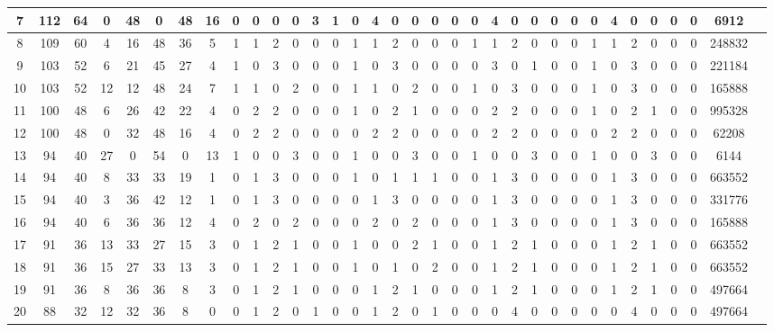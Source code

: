 \begin{frame}
{{\begin{tabular}{|c|c|c|c|c|c|c|c|c|c|c|c|c|c|c|c|c|c|c|c|c|c|c|c|c|c|c|c|c|c|c|c|c|c|}
				\hline
				7 & 112 & 64 & 0 & 48 & 0 & 48 & 16 & 0 & 0 & 0 & 0 & 3 & 1 & 0 & 4 & 0 & 0 & 0 & 0 & 0 & 4 & 0 & 0 & 0 & 0 & 0 & 4 & 0 & 0 & 0 & 0 & 6912\\
				\hline
				8 & 109 & 60 & 4 & 16 & 48 & 36 & 5 & 1 & 1 & 2 & 0 & 0 & 0 & 1 & 1 & 2 & 0 & 0 & 0 & 1 & 1 & 2 & 0 & 0 & 0 & 1 & 1 & 2 & 0 & 0 & 0 & 248832\\
				\hline
				9 & 103 & 52 & 6 & 21 & 45 & 27 & 4 & 1 & 0 & 3 & 0 & 0 & 0 & 1 & 0 & 3 & 0 & 0 & 0 & 0 & 3 & 0 & 1 & 0 & 0 & 1 & 0 & 3 & 0 & 0 & 0 & 221184\\
				\hline
				10 & 103 & 52 & 12 & 12 & 48 & 24 & 7 & 1 & 1 & 0 & 2 & 0 & 0 & 1 & 1 & 0 & 2 & 0 & 0 & 1 & 0 & 3 & 0 & 0 & 0 & 1 & 0 & 3 & 0 & 0 & 0 & 165888\\
				\hline
				11 & 100 & 48 & 6 & 26 & 42 & 22 & 4 & 0 & 2 & 2 & 0 & 0 & 0 & 1 & 0 & 2 & 1 & 0 & 0 & 0 & 2 & 2 & 0 & 0 & 0 & 1 & 0 & 2 & 1 & 0 & 0 & 995328\\
				\hline
				12 & 100 & 48 & 0 & 32 & 48 & 16 & 4 & 0 & 2 & 2 & 0 & 0 & 0 & 0 & 2 & 2 & 0 & 0 & 0 & 0 & 2 & 2 & 0 & 0 & 0 & 0 & 2 & 2 & 0 & 0 & 0 & 62208\\
				\hline
				13 & 94 & 40 & 27 & 0 & 54 & 0 & 13 & 1 & 0 & 0 & 3 & 0 & 0 & 1 & 0 & 0 & 3 & 0 & 0 & 1 & 0 & 0 & 3 & 0 & 0 & 1 & 0 & 0 & 3 & 0 & 0 & 6144\\
				\hline
				14 & 94 & 40 & 8 & 33 & 33 & 19 & 1 & 0 & 1 & 3 & 0 & 0 & 0 & 1 & 0 & 1 & 1 & 1 & 0 & 0 & 1 & 3 & 0 & 0 & 0 & 0 & 1 & 3 & 0 & 0 & 0 & 663552\\
				\hline
				15 & 94 & 40 & 3 & 36 & 42 & 12 & 1 & 0 & 1 & 3 & 0 & 0 & 0 & 0 & 1 & 3 & 0 & 0 & 0 & 0 & 1 & 3 & 0 & 0 & 0 & 0 & 1 & 3 & 0 & 0 & 0 & 331776\\
				\hline
				16 & 94 & 40 & 6 & 36 & 36 & 12 & 4 & 0 & 2 & 0 & 2 & 0 & 0 & 0 & 2 & 0 & 2 & 0 & 0 & 0 & 1 & 3 & 0 & 0 & 0 & 0 & 1 & 3 & 0 & 0 & 0 & 165888\\
				\hline
				17 & 91 & 36 & 13 & 33 & 27 & 15 & 3 & 0 & 1 & 2 & 1 & 0 & 0 & 1 & 0 & 0 & 2 & 1 & 0 & 0 & 1 & 2 & 1 & 0 & 0 & 0 & 1 & 2 & 1 & 0 & 0 & 663552\\
				\hline
				18 & 91 & 36 & 15 & 27 & 33 & 13 & 3 & 0 & 1 & 2 & 1 & 0 & 0 & 1 & 0 & 1 & 0 & 2 & 0 & 0 & 1 & 2 & 1 & 0 & 0 & 0 & 1 & 2 & 1 & 0 & 0 & 663552\\
				\hline
				19 & 91 & 36 & 8 & 36 & 36 & 8 & 3 & 0 & 1 & 2 & 1 & 0 & 0 & 0 & 1 & 2 & 1 & 0 & 0 & 0 & 1 & 2 & 1 & 0 & 0 & 0 & 1 & 2 & 1 & 0 & 0 & 497664\\
				\hline
				20 & 88 & 32 & 12 & 32 & 36 & 8 & 0 & 0 & 1 & 2 & 0 & 1 & 0 & 0 & 1 & 2 & 0 & 1 & 0 & 0 & 0 & 4 & 0 & 0 & 0 & 0 & 0 & 4 & 0 & 0 & 0 & 497664\\

\end{tabular}}}
\end{frame}
